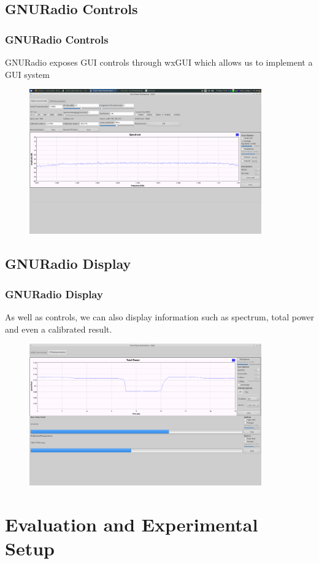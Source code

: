 \documentclass[notes]{beamer}
\begin{document}
\subsection{GNURadio Controls}
\begin{frame}
\frametitle{GNURadio Controls}
GNURadio exposes GUI controls through wxGUI which allows us to implement a GUI system
\begin{figure}\label{GNURadio_GUI}
\includegraphics[width=10cm]{images/radiometer_gui.png}
\end{figure}

\end{frame}

\subsection{GNURadio Display}
\begin{frame}
\frametitle{GNURadio Display}
As well as controls, we can also display information such as spectrum, total power and even a calibrated result.
\begin{figure}\label{GNURadio_GUI}
\includegraphics[width=10cm]{images/Lab1_TPR_at_end_exp.png}
\end{figure}
\end{frame}
\section{Evaluation and Experimental Setup}
\end{document}
